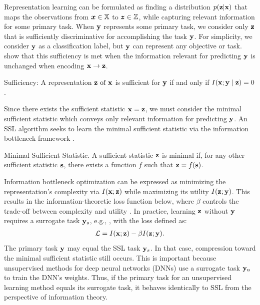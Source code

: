Representation learning can be formulated as finding a distribution $p({\mathbf{z}}|{\mathbf{x}})$ that maps the observations from ${\bm{x}} \in {\mathbb{X}}$ to ${\bm{z}} \in {\mathbb{Z}}$, while capturing relevant information for some primary task. When ${\mathbf{y}}$ represents some primary task, we consider only ${\mathbf{z}}$ that is sufficiently discriminative for accomplishing the task ${\mathbf{y}}$. For simplicity, we consider ${\mathbf{y}}$ as a classification label, but ${\mathbf{y}}$ can represent any objective or task. \citet{federici2020learning} show that this sufficiency is met when the information relevant for predicting ${\mathbf{y}}$ is unchanged when encoding ${\mathbf{x}} \rightarrow {\mathbf{z}}$.

\begin{definition}
    Sufficiency: A representation ${\mathbf{z}} \text { of } {\mathbf{x}}$ is sufficient for ${\mathbf{y}}$ if and only if $I({\mathbf{x}} ; {\mathbf{y}} \mid {\mathbf{z}})=0 $.
    \label{def:lb-suff}
\end{definition}

Since there exists the sufficient statistic ${\mathbf{x}}={\mathbf{z}}$, we must consider the minimal sufficient statistic which conveys only relevant information for predicting ${\mathbf{y}}$. An SSL algorithm seeks to learn the minimal sufficient statistic via the information bottleneck framework \citep{shwartz2023compress}.

\begin{definition}
Minimal Sufficient Statistic. A sufficient statistic ${\mathbf{z}}$ is minimal if, for any other sufficient statistic ${\mathbf{s}}$, there exists a function $f$ such that ${\mathbf{z}} = f({\mathbf{s}})$.
\label{def:lb-minsuff}
\end{definition}

Information bottleneck optimization can be expressed as minimizing the representation's complexity via $I({\mathbf{x}};{\mathbf{z}})$ while maximizing its utility $I({\mathbf{z}};{\mathbf{y}})$. This results in the information-theoretic loss function below, where $\beta$ controls the trade-off between complexity and utility \citep{shwartz2023compress}. In practice, learning ${\mathbf{z}}$ without ${\mathbf{y}}$ requires a surrogate task ${\mathbf{y}}_{s}$, e.g., \citet{chen2020simple}, with the loss defined as:
\begin{align}
\mathcal{L}=I({\mathbf{x}} ; {\mathbf{z}})-\beta I({\mathbf{z}} ;{\mathbf{y}}).
\end{align}
The primary task ${\mathbf{y}}$ may equal the SSL task ${\mathbf{y}}_{s}$. In that case, compression toward the minimal sufficient statistic still occurs. This is important because unsupervised methods for deep neural networks (DNNs) use a surrogate task ${\mathbf{y}}_{u}$ to train the DNN's weights. Thus, if the primary task for an unsupervised learning method equals its surrogate task, it behaves identically to SSL from the perspective of information theory.

